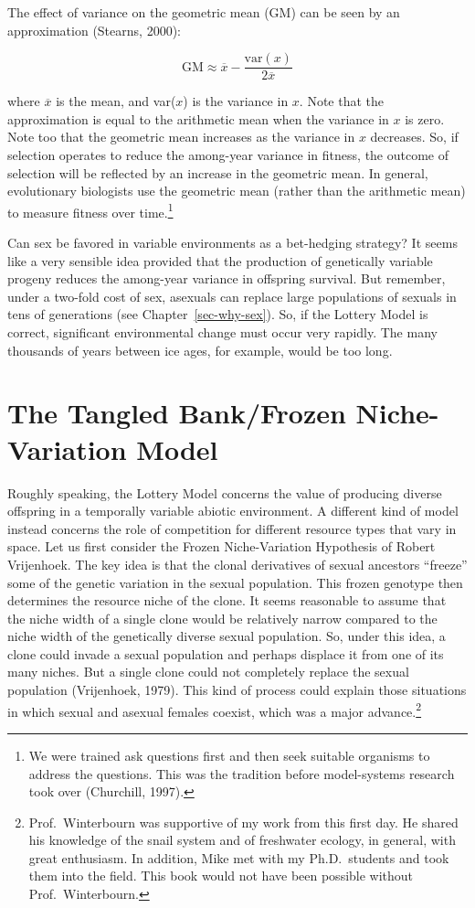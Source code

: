 \documentclass[
  letterpaper,
]{book}
\begin{document}
The effect of variance on the geometric mean (GM) can be seen by an
approximation (Stearns, 2000):

\[\text{GM} \approx \overline{x} - \frac{\text{var}(x)}{2\overline{x}}\]

where \(\overline{x}\) is the mean, and var(\(x\)) is the variance in
\(x\). Note that the approximation is equal to the arithmetic mean when
the variance in \(x\) is zero. Note too that the geometric mean
increases as the variance in \(x\) decreases. So, if selection operates
to reduce the among-year variance in fitness, the outcome of selection
will be reflected by an increase in the geometric mean. In general,
evolutionary biologists use the geometric mean (rather than the
arithmetic mean) to measure fitness over time.\footnote{We were trained
  ask questions first and then seek suitable organisms to address the
  questions. This was the tradition before model-systems research took
  over (Churchill, 1997).}

Can sex be favored in variable environments as a bet-hedging strategy?
It seems like a very sensible idea provided that the production of
genetically variable progeny reduces the among-year variance in
offspring survival. But remember, under a two-fold cost of sex, asexuals
can replace large populations of sexuals in tens of generations (see
Chapter~\ref{sec-why-sex}). So, if the Lottery Model is correct,
significant environmental change must occur very rapidly. The many
thousands of years between ice ages, for example, would be too long.

\hypertarget{the-tangled-bankfrozen-niche-variation-model}{%
\section{The Tangled Bank/Frozen Niche-Variation
Model}\label{the-tangled-bankfrozen-niche-variation-model}}

Roughly speaking, the Lottery Model concerns the value of producing
diverse offspring in a temporally variable abiotic environment. A
different kind of model instead concerns the role of competition for
different resource types that vary in space. Let us first consider the
Frozen Niche-Variation Hypothesis of Robert Vrijenhoek. The key idea is
that the clonal derivatives of sexual ancestors ``freeze'' some of the
genetic variation in the sexual population. This frozen genotype then
determines the resource niche of the clone. It seems reasonable to
assume that the niche width of a single clone would be relatively narrow
compared to the niche width of the genetically diverse sexual
population. So, under this idea, a clone could invade a sexual
population and perhaps displace it from one of its many niches. But a
single clone could not completely replace the sexual population
(Vrijenhoek, 1979). This kind of process could explain those situations
in which sexual and asexual females coexist, which was a major
advance.\footnote{Prof.~Winterbourn was supportive of my work from this
  first day. He shared his knowledge of the snail system and of
  freshwater ecology, in general, with great enthusiasm. In addition,
  Mike met with my Ph.D.~students and took them into the field. This
  book would not have been possible without Prof.~Winterbourn.}
\end{document}
